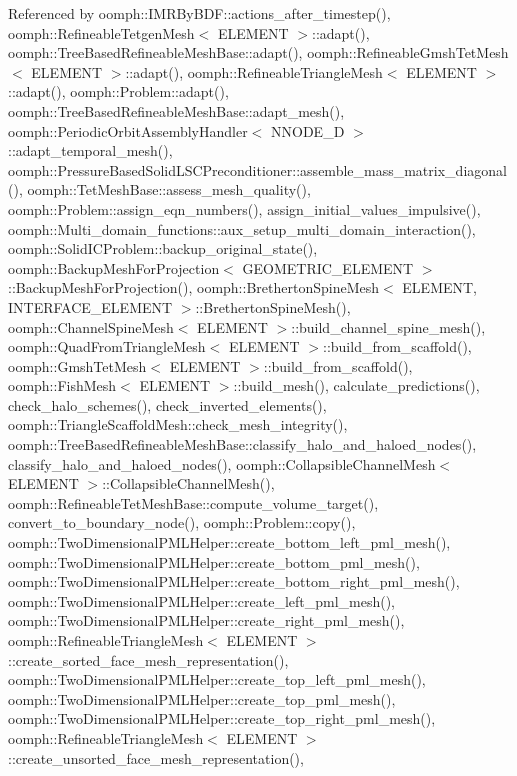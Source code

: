 Referenced by oomph\+::\+I\+M\+R\+By\+B\+D\+F\+::actions\+\_\+after\+\_\+timestep(), oomph\+::\+Refineable\+Tetgen\+Mesh$<$ E\+L\+E\+M\+E\+N\+T $>$\+::adapt(), oomph\+::\+Tree\+Based\+Refineable\+Mesh\+Base\+::adapt(), oomph\+::\+Refineable\+Gmsh\+Tet\+Mesh$<$ E\+L\+E\+M\+E\+N\+T $>$\+::adapt(), oomph\+::\+Refineable\+Triangle\+Mesh$<$ E\+L\+E\+M\+E\+N\+T $>$\+::adapt(), oomph\+::\+Problem\+::adapt(), oomph\+::\+Tree\+Based\+Refineable\+Mesh\+Base\+::adapt\+\_\+mesh(), oomph\+::\+Periodic\+Orbit\+Assembly\+Handler$<$ N\+N\+O\+D\+E\+\_\+D $>$\+::adapt\+\_\+temporal\+\_\+mesh(), oomph\+::\+Pressure\+Based\+Solid\+L\+S\+C\+Preconditioner\+::assemble\+\_\+mass\+\_\+matrix\+\_\+diagonal(), oomph\+::\+Tet\+Mesh\+Base\+::assess\+\_\+mesh\+\_\+quality(), oomph\+::\+Problem\+::assign\+\_\+eqn\+\_\+numbers(), assign\+\_\+initial\+\_\+values\+\_\+impulsive(), oomph\+::\+Multi\+\_\+domain\+\_\+functions\+::aux\+\_\+setup\+\_\+multi\+\_\+domain\+\_\+interaction(), oomph\+::\+Solid\+I\+C\+Problem\+::backup\+\_\+original\+\_\+state(), oomph\+::\+Backup\+Mesh\+For\+Projection$<$ G\+E\+O\+M\+E\+T\+R\+I\+C\+\_\+\+E\+L\+E\+M\+E\+N\+T $>$\+::\+Backup\+Mesh\+For\+Projection(), oomph\+::\+Bretherton\+Spine\+Mesh$<$ E\+L\+E\+M\+E\+N\+T, I\+N\+T\+E\+R\+F\+A\+C\+E\+\_\+\+E\+L\+E\+M\+E\+N\+T $>$\+::\+Bretherton\+Spine\+Mesh(), oomph\+::\+Channel\+Spine\+Mesh$<$ E\+L\+E\+M\+E\+N\+T $>$\+::build\+\_\+channel\+\_\+spine\+\_\+mesh(), oomph\+::\+Quad\+From\+Triangle\+Mesh$<$ E\+L\+E\+M\+E\+N\+T $>$\+::build\+\_\+from\+\_\+scaffold(), oomph\+::\+Gmsh\+Tet\+Mesh$<$ E\+L\+E\+M\+E\+N\+T $>$\+::build\+\_\+from\+\_\+scaffold(), oomph\+::\+Fish\+Mesh$<$ E\+L\+E\+M\+E\+N\+T $>$\+::build\+\_\+mesh(), calculate\+\_\+predictions(), check\+\_\+halo\+\_\+schemes(), check\+\_\+inverted\+\_\+elements(), oomph\+::\+Triangle\+Scaffold\+Mesh\+::check\+\_\+mesh\+\_\+integrity(), oomph\+::\+Tree\+Based\+Refineable\+Mesh\+Base\+::classify\+\_\+halo\+\_\+and\+\_\+haloed\+\_\+nodes(), classify\+\_\+halo\+\_\+and\+\_\+haloed\+\_\+nodes(), oomph\+::\+Collapsible\+Channel\+Mesh$<$ E\+L\+E\+M\+E\+N\+T $>$\+::\+Collapsible\+Channel\+Mesh(), oomph\+::\+Refineable\+Tet\+Mesh\+Base\+::compute\+\_\+volume\+\_\+target(), convert\+\_\+to\+\_\+boundary\+\_\+node(), oomph\+::\+Problem\+::copy(), oomph\+::\+Two\+Dimensional\+P\+M\+L\+Helper\+::create\+\_\+bottom\+\_\+left\+\_\+pml\+\_\+mesh(), oomph\+::\+Two\+Dimensional\+P\+M\+L\+Helper\+::create\+\_\+bottom\+\_\+pml\+\_\+mesh(), oomph\+::\+Two\+Dimensional\+P\+M\+L\+Helper\+::create\+\_\+bottom\+\_\+right\+\_\+pml\+\_\+mesh(), oomph\+::\+Two\+Dimensional\+P\+M\+L\+Helper\+::create\+\_\+left\+\_\+pml\+\_\+mesh(), oomph\+::\+Two\+Dimensional\+P\+M\+L\+Helper\+::create\+\_\+right\+\_\+pml\+\_\+mesh(), oomph\+::\+Refineable\+Triangle\+Mesh$<$ E\+L\+E\+M\+E\+N\+T $>$\+::create\+\_\+sorted\+\_\+face\+\_\+mesh\+\_\+representation(), oomph\+::\+Two\+Dimensional\+P\+M\+L\+Helper\+::create\+\_\+top\+\_\+left\+\_\+pml\+\_\+mesh(), oomph\+::\+Two\+Dimensional\+P\+M\+L\+Helper\+::create\+\_\+top\+\_\+pml\+\_\+mesh(), oomph\+::\+Two\+Dimensional\+P\+M\+L\+Helper\+::create\+\_\+top\+\_\+right\+\_\+pml\+\_\+mesh(), oomph\+::\+Refineable\+Triangle\+Mesh$<$ E\+L\+E\+M\+E\+N\+T $>$\+::create\+\_\+unsorted\+\_\+face\+\_\+mesh\+\_\+representation(), 